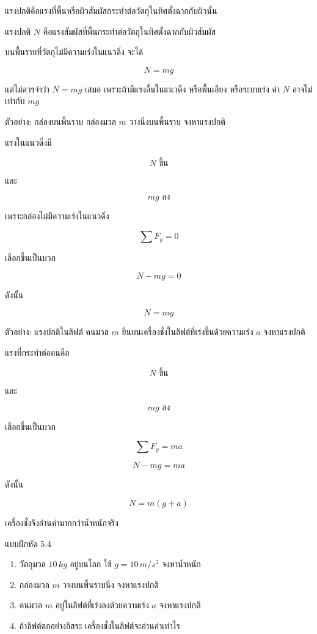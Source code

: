 แรงปกติคือแรงที่พื้นหรือผิวสัมผัสกระทำต่อวัตถุในทิศตั้งฉากกับผิวนั้น

\begin{tcolorbox}[title=นิยาม]
แรงปกติ $N$ คือแรงสัมผัสที่พื้นกระทำต่อวัตถุในทิศตั้งฉากกับผิวสัมผัส
\end{tcolorbox}

บนพื้นราบที่วัตถุไม่มีความเร่งในแนวดิ่ง จะได้

\[
N=mg
\]

แต่ไม่ควรจำว่า $N=mg$ เสมอ เพราะถ้ามีแรงอื่นในแนวดิ่ง หรือพื้นเอียง หรือระบบเร่ง ค่า $N$ อาจไม่เท่ากับ $mg$

\begin{examplebox}{ตัวอย่าง: กล่องบนพื้นราบ}
กล่องมวล $m$ วางนิ่งบนพื้นราบ จงหาแรงปกติ

แรงในแนวดิ่งมี

\[
N \text{ ขึ้น}
\]

และ

\[
mg \text{ ลง}
\]

เพราะกล่องไม่มีความเร่งในแนวดิ่ง

\[
\sum F_y=0
\]

เลือกขึ้นเป็นบวก

\[
N-mg=0
\]

ดังนั้น

\[
\boxed{N=mg}
\]
\end{examplebox}

\begin{examplebox}{ตัวอย่าง: แรงปกติในลิฟต์}
คนมวล $m$ ยืนบนเครื่องชั่งในลิฟต์ที่เร่งขึ้นด้วยความเร่ง $a$ จงหาแรงปกติ

แรงที่กระทำต่อคนคือ

\[
N \text{ ขึ้น}
\]

และ

\[
mg \text{ ลง}
\]

เลือกขึ้นเป็นบวก

\[
\sum F_y=ma
\]

\[
N-mg=ma
\]

ดังนั้น

\[
\boxed{N=m(g+a)}
\]

เครื่องชั่งจึงอ่านค่ามากกว่าน้ำหนักจริง
\end{examplebox}

\begin{exercisebox}{แบบฝึกหัด 5.4}
\begin{enumerate}
    \item วัตถุมวล $10\,\si{kg}$ อยู่บนโลก ใช้ $g=10\,\si{m/s^2}$ จงหาน้ำหนัก
    \item กล่องมวล $m$ วางบนพื้นราบนิ่ง จงหาแรงปกติ
    \item คนมวล $m$ อยู่ในลิฟต์ที่เร่งลงด้วยความเร่ง $a$ จงหาแรงปกติ
    \item ถ้าลิฟต์ตกอย่างอิสระ เครื่องชั่งในลิฟต์จะอ่านค่าเท่าไร
\end{enumerate}
\end{exercisebox}

